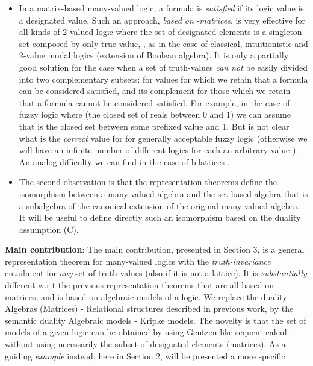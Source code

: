 \documentclass[10pt,twocolumn]{article}
\begin{document}
\begin{itemize}
  \item In a matrix-based many-valued logic, a formula is \emph{satisfied} if its logic value is a designated
  value.
  Such an approach, \emph{based on} \emph{-matrices}, is very effective for all kinds of 2-valued logic
  where the set of designated elements is a singleton set composed by only true value, , as in the case of classical, intuitionistic and 2-value
  modal logics (extension of Boolean algebra). It is only a partially
  good  solution for the case when a set of truth-values \emph{can not} be
  easily divided into two complementary subsets:  for
  values for which we retain that a formula can be considered
  satisfied, and its complement  for those which we retain that a formula cannot be considered satisfied. For example, in the case
  of fuzzy logic where  (the closed set of reals between 0 and
  1)  we can assume that  is the closed set between
  some prefixed value  and 1. But is not clear what is the \emph{correct} value for
   for generally acceptable fuzzy logic
(otherwise we will have an infinite number of different logics for each an arbitrary value ).\\
An analog difficulty we can find in the case of bilattices  \cite{Gins88,Fitt91,ArAv94,RuFa94,LaSa94,KSim01,Majk05Fu}.
\item  The
  second observation  is that the
  representation theorems define the
  isomorphism between a many-valued algebra and the
  set-based algebra that is a subalgebra of the canonical extension
  of the original many-valued algebra. It will be useful
  to define directly such an isomorphism based on the
  duality assumption (C).
\end{itemize}
 \textbf{Main contribution}: The main contribution, presented in
 Section 3, is a general representation theorem for many-valued logics
 with the \emph{truth-invariance} entailment for \emph{any} set of truth-values  (also if it is not a lattice).
  It is \emph{substantially} different w.r.t the previous representation theorems that are all based on
 matrices, and is based on algebraic models of a logic. We
replace the duality Algebras (Matrices) - Relational structures
described in previous work, by the semantic duality Algebraic models
- Kripke models. The novelty is that the set of models of a given
logic can be obtained by using Gentzen-like sequent calculi
\cite{Majk09BS} without  using necessarily the subset of designated
elements (matrices). As a guiding
 \emph{example} instead, here in Section 2, will be presented a more specific
\end{document}

